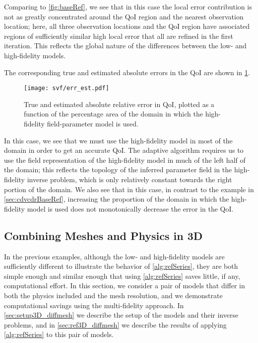 %
Comparing to \cref{fig:baseRef}, we see that in this case the local error contribution is not as greatly concentrated around the QoI region and the nearest observation location; here, all three observation locations and the QoI region have associated regions of sufficiently similar high local error that all are refined in the first iteration. This reflects the global nature of the differences between the low- and high-fidelity models. 

The corresponding true and estimated absolute errors in the QoI are shown in \cref{fig:svfErr}.
%
\begin{figure}[htbp]
\centering
\texttt{[image: svf/err\_est.pdf]}
\caption{True and estimated absolute relative error in QoI, plotted as a function of the percentage area of the domain in which the high-fidelity field-parameter model is used.}
\label{fig:svfErr}
\end{figure}
%
In this case, we see that we must use the high-fidelity model in most of the domain in order to get an accurate QoI. The adaptive algorithm requires us to use the field representation of the high-fidelity model in much of the left half of the domain; this reflects the topology of the inferred parameter field in the high-fidelity inverse problem, which is only relatively constant towards the right portion of the domain. We also see that in this case, in contrast to the example in \cref{sec:cdvcdrBaseRef}, increasing the proportion of the domain in which the high-fidelity model is used does not monotonically decrease the error in the QoI.

\subsection{Combining Meshes and Physics in 3D} \label{sec:diffvcdr3D}

In the previous examples, although the low- and high-fidelity models are sufficiently different to illustrate the behavior of \cref{alg:refSeries}, they are both simple enough and similar enough that using \cref{alg:refSeries} saves little, if any, computational effort. In this section, we consider a pair of models that differ in both the physics included and the mesh resolution, and we demonstrate computational savings using the multi-fidelity approach. In \cref{sec:setup3D_diffmesh} we describe the setup of the models and their inverse problems, and in \cref{sec:ref3D_diffmesh} we describe the results of applying \cref{alg:refSeries} to this pair of models.

